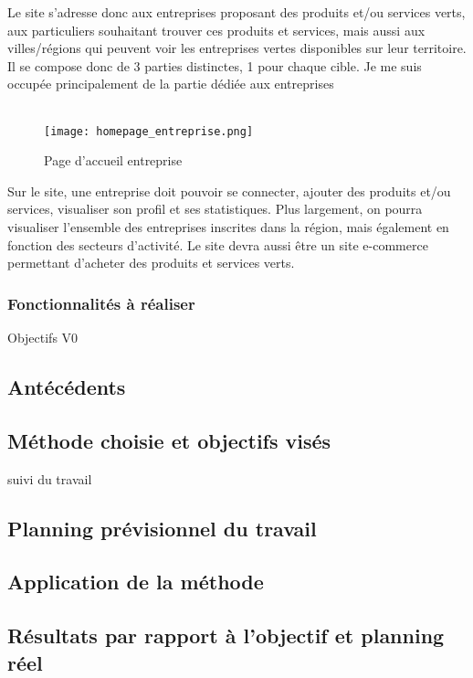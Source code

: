 Le site s'adresse donc aux entreprises proposant des produits et/ou services verts, aux particuliers souhaitant trouver ces produits et services, 
mais aussi aux villes/régions qui peuvent voir les entreprises vertes disponibles sur leur territoire. Il se compose donc de 3 parties distinctes, 1 pour chaque cible.
Je me suis occupée principalement de la partie dédiée aux entreprises
\\\\
\begin{figure}[H]
    \centering
    \texttt{[image: homepage\_entreprise.png]}
    \caption{Page d'accueil entreprise}
\end{figure}


Sur le site, une entreprise doit pouvoir se connecter, ajouter des produits et/ou services, visualiser son profil et ses statistiques.
Plus largement, on pourra visualiser l'ensemble des entreprises inscrites dans la région, mais également en fonction des secteurs d'activité. Le site devra aussi être un site e-commerce permettant d'acheter des produits et services verts.

\subsubsection{Fonctionnalités à réaliser}

Objectifs V0

\pagebreak
\subsection{Antécédents}
\pagebreak
\subsection{Méthode choisie et objectifs visés}
suivi du travail
\pagebreak
\subsection{Planning prévisionnel du travail}
\pagebreak
\subsection{Application de la méthode}

\pagebreak
\subsection{Résultats par rapport à l'objectif et planning réel}

